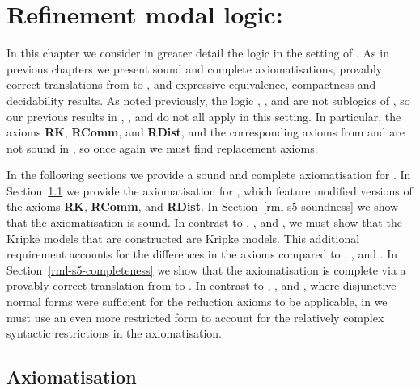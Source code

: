 \chapter{Refinement modal logic: \classS{}}\label{rml-s5}

In this chapter we consider in greater detail the logic \logicRmlS{} in the setting of \classS{}.
As in previous chapters we present sound and complete axiomatisations, provably correct translations from \langRml{} to \langMl{}, and expressive equivalence, compactness and decidability results.
As noted previously, the logic \logicRmlK{}, \logicRmlKFF{}, and \logicKD{} are not sublogics of \logicRmlS{}, so our previous results in \logicRmlK{}, \logicRmlKFF{}, and \logicKD{} do not all apply in this setting.
In particular, the axioms {\bf RK}, {\bf RComm}, and {\bf RDist}, and the corresponding axioms from \logicRmlKFF{} and \logicRmlKD{} are not sound in \logicRmlS{}, so once again we must find replacement axioms.

In the following sections we provide a sound and complete axiomatisation for \logicRmlS{}.
In Section~\ref{rml-s5-axiomatisation} we provide the axiomatisation for \logicRmlS{}, which feature modified versions of the axioms {\bf RK}, {\bf RComm}, and {\bf RDist}.
In Section~\ref{rml-s5-soundness} we show that the axiomatisation is sound.
In contrast to \logicRmlK{}, \logicRmlKFF{}, and \logicRmlKD{}, we must show that the Kripke models that are constructed are \classS{} Kripke models.
This additional requirement accounts for the differences in the axioms compared to \logicRmlK{}, \logicRmlKFF{}, and \logicRmlKD{}.
In Section~\ref{rml-s5-completeness} we show that the axiomatisation is complete via a provably correct translation from \langRml{} to \langMl{}.
In contrast to \logicRmlK{}, \logicRmlKFF{}, and \logicRmlKD{}, where disjunctive normal forms were sufficient for the reduction axioms to be applicable, in \logicRmlS{} we must use an even more restricted form to account for the relatively complex syntactic restrictions in the axiomatisation.

\section{Axiomatisation}\label{rml-s5-axiomatisation}

